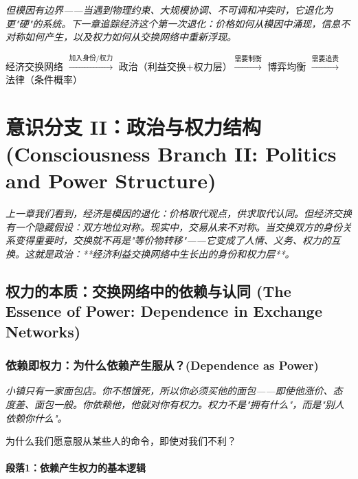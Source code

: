 \documentclass[a4paper,12pt]{book}
\newenvironment{motivation}{\begin{tcolorbox}[colback=gray!10,colframe=gray!60,title=\textit{动机}]\small\itshape}{\end{tcolorbox}}
\newenvironment{logicmap}{\begin{tcolorbox}[colback=blue!5,colframe=blue!50,title=\textbf{逻辑地图}]\centering}{\end{tcolorbox}}
\newenvironment{questionbox}{\begin{tcolorbox}[colback=red!3,colframe=red!60]}{\end{tcolorbox}}
\begin{document}
\begin{motivation}
\begin{motivation}
\begin{motivation}
但模因有边界——当遇到物理约束、大规模协调、不可调和冲突时，它退化为更"硬"的系统。下一章追踪经济这个第一次退化：价格如何从模因中涌现，信息不对称如何产生，以及权力如何从交换网络中重新浮现。




	\begin{logicmap}
		经济交换网络 $\xrightarrow{\text{加入身份/权力}}$ 政治（利益交换+权力层）$\xrightarrow{\text{需要制衡}}$ 博弈均衡 $\xrightarrow{\text{需要追责}}$ 法律（条件概率）
	\end{logicmap}

	\chapter{意识分支 II：政治与权力结构 (Consciousness Branch II: Politics and Power Structure)}
	\begin{motivation}
		上一章我们看到，经济是模因的退化：价格取代观点，供求取代认同。但经济交换有一个隐藏假设：双方地位对称。现实中，交易从来不对称。当交换双方的身份关系变得重要时，交换就不再是"等价物转移"——它变成了人情、义务、权力的互换。这就是政治：**经济利益交换网络中生长出的身份和权力层**。
	\end{motivation}

	\section{权力的本质：交换网络中的依赖与认同 (The Essence of Power: Dependence in Exchange Networks)}

	\subsection{依赖即权力：为什么依赖产生服从？(Dependence as Power)}
	\begin{motivation}
		小镇只有一家面包店。你不想饿死，所以你必须买他的面包——即使他涨价、态度差、面包一般。你依赖他，他就对你有权力。权力不是"拥有什么"，而是"别人依赖你什么"。
	\end{motivation}
	\begin{questionbox}
		为什么我们愿意服从某些人的命令，即使对我们不利？
	\end{questionbox}

	\subsubsection*{段落1：依赖产生权力的基本逻辑}


\end{motivation}
\end{motivation}
\end{motivation}
\end{document}
